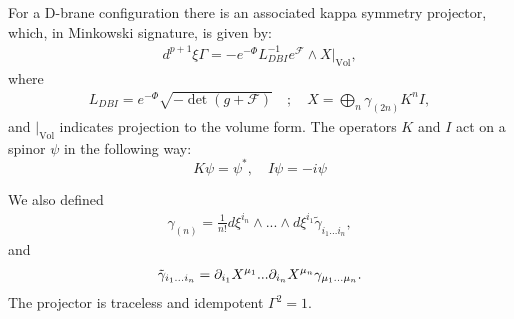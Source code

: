 For a D-brane configuration there is an associated kappa symmetry projector, which, in Minkowski signature, is given by\cite{Skenderis:2002vf}:
\begin{align}
d^{p+1} \xi \Gamma = - e^{-\Phi} L_{DBI}^{-1} e^{\mathcal{F}}\wedge X|_{\text{Vol}},
\end{align}
where
\begin{align}
L_{DBI}= e^{-\Phi} \sqrt{-\det  (g+\mathcal{F})}\quad;
\quad
X = \bigoplus_n \gamma_{(2n)} K^n I,
\end{align}
and $|_{\text{Vol}}$ indicates projection to the volume form.
The operators $K$ and $I$ act on a spinor $\psi$ in the following way:
\begin{equation}
 K \psi = \psi^* , \quad I \psi = -i \psi
\end{equation}


We also defined
\begin{align}
\gamma_{(n)} = \frac{1}{n !}d\xi^{i_n}\wedge ... \wedge d\xi^{i_1} \tilde{\gamma}_{i_1...i_n},
\end{align}
and
\begin{align}
\tilde{\gamma}_{i_1...i_n} = \partial_{i_1} X^{\mu_1}...\partial_{i_n} X^{\mu_n}\gamma_{\mu_1...\mu_n}.
\end{align}
The projector is traceless and idempotent $\Gamma^2 = 1$.

